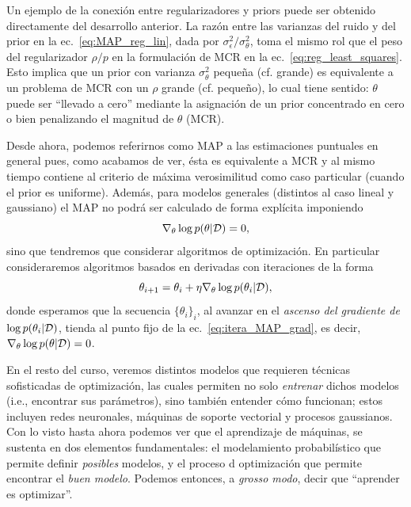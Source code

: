 Un ejemplo de la conexión entre regularizadores y priors puede ser obtenido directamente del desarrollo anterior. La razón entre las varianzas del ruido y del prior en la ec.~\eqref{eq:MAP_reg_lin}, dada por $\sigma_\epsilon^2/\sigma_\theta^2$, toma el mismo rol que el peso del regularizador $\rho/p$ en la formulación de MCR en la  ec.~\eqref{eq:reg_least_squares}. Esto implica que un prior con varianza $\sigma_\theta^2$ pequeña (cf. grande) es equivalente a un problema de MCR con un $\rho$ grande (cf. pequeño), lo cual tiene sentido:  $\theta$ puede ser ``llevado a cero'' mediante la asignación de un prior concentrado en cero o bien penalizando el magnitud de $\theta$ (MCR).

Desde ahora, podemos referirnos como MAP a las estimaciones puntuales en general pues, como acabamos de ver, ésta es equivalente a MCR y al mismo tiempo contiene al criterio de máxima verosimilitud como caso particular (cuando el prior es uniforme). Además, para modelos generales (distintos al caso lineal y gaussiano) el MAP no podrá ser calculado de forma explícita imponiendo 
\begin{equation}
 	\nabla_\theta  \log p(\theta|{\mathcal D}) = 0,
 \end{equation}
 sino que tendremos que considerar algoritmos de optimización. En particular consideraremos algoritmos basados en derivadas con iteraciones de la forma
 \begin{equation}
 	\theta_{i+1} = \theta_i + \eta \nabla_\theta  \log p(\theta_i|{\mathcal D}), \label{eq:itera_MAP_grad}
 \end{equation}
 donde esperamos que la secuencia $\{\theta_i\}_i$, al avanzar en el \emph{ascenso del gradiente de $\log p(\theta_i|{\mathcal D})$}, tienda al punto fijo de la ec.~\eqref{eq:itera_MAP_grad}, es decir, $\nabla_\theta  \log p(\theta|{\mathcal D}) = 0$. 

\begin{remark} 
En el resto del curso, veremos distintos modelos que requieren técnicas sofisticadas de optimización, las cuales permiten no solo \emph{entrenar} dichos modelos (i.e., encontrar sus parámetros), sino también entender cómo funcionan; estos incluyen redes neuronales,  máquinas de soporte vectorial y procesos gaussianos. Con lo visto hasta ahora podemos ver que el aprendizaje de máquinas, se sustenta  en dos elementos fundamentales: el modelamiento probabilístico que permite definir \emph{posibles} modelos, y el proceso d optimización que permite encontrar el \emph{buen modelo}. Podemos entonces, a \emph{grosso modo}, decir que ``aprender es optimizar''.
\end{remark}


